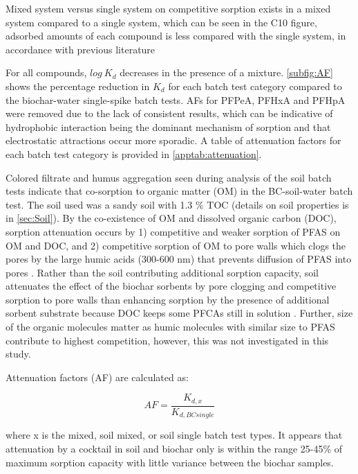 Mixed system versus single system on competitive sorption exists in a mixed system compared to a single system, which can be seen in the C10 figure, adsorbed amounts of each compound is less compared with the single system, in accordance with previous literature \citep{deng2010removal,zhou2010sorption}
  
For all compounds, $log~K_d$ decreases in the presence of a mixture. 
\cref{subfig:AF} shows the percentage reduction in $K_d$ for each batch test category compared to the biochar-water single-spike batch tests. AFs for PFPeA, PFHxA and PFHpA were removed due to the lack of consistent results, which can be indicative of hydrophobic interaction being the dominant mechanism of sorption and that electrostatic attractions occur more sporadic. A table of attenuation factors for each batch test category is provided in \cref{apptab:attenuation}.

Colored filtrate and humus aggregation seen during analysis of the soil batch tests indicate that co-sorption to organic matter (OM) in the BC-soil-water batch test. The soil used was a sandy soil with 1.3 \% TOC (details on soil properties is in \cref{sec:Soil}). By the co-existence of OM and dissolved organic carbon (DOC), sorption attenuation occurs by 1) competitive and weaker sorption of PFAS on OM and DOC, and 2) competitive sorption of OM to pore walls which clogs the pores by the large humic acids (300-600 nm) that prevents diffusion of PFAS into pores \citep{Cornelissen2006,kluvcakova2018size}. Rather than the soil contributing additional sorption capacity, soil attenuates the effect of the biochar sorbents by pore clogging and competitive sorption to pore walls than enhancing sorption by the presence of additional sorbent substrate because DOC keeps some PFCAs still in solution \citep{du2014adsorption}. Further, size of the organic molecules matter as humic molecules with similar size to PFAS contribute to highest competition, however, this was not investigated in this study. 


Attenuation factors (AF) are calculated as:

\begin{equation}
    AF = \frac{K_{d,x}}{K_{d,BC single}}
\end{equation}

where x is the mixed, soil mixed, or soil single batch test types. It appears that attenuation by a cocktail in soil and biochar only is within the range 25-45\% of maximum sorption capacity with little variance between the biochar samples.  


